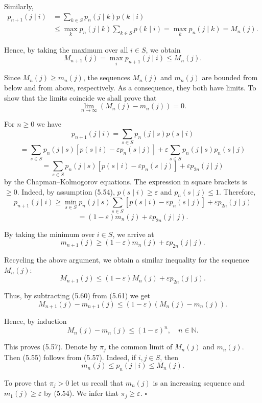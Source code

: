 \begin{Proof}
Similarly,
\[
\begin{aligned}
p_{n+1}(j \mid i) &= \sum_{k \in S} p_n(j \mid k) p(k \mid i) \\
&\leq \max_k p_n(j \mid k) \sum_{k \in S} p(k \mid i) = \max_k p_n(j \mid k) = M_n(j).
\end{aligned}
\]

Hence, by taking the maximum over all $i \in S$, we obtain
\[
M_{n+1}(j) = \max_i p_{n+1}(j \mid i) \leq M_n(j).
\]

Since $M_n(j) \geq m_n(j)$, the sequences $M_n(j)$ and $m_n(j)$ are bounded from below and from above, respectively. As a consequence, they both have limits. To show that the limits coincide we shall prove that
\[
\lim_{n \to \infty} (M_n(j) - m_n(j)) = 0. \tag{5.57}
\]

For $n \geq 0$ we have
\[
p_{n+1}(j \mid i) = \sum_{s \in S} p_n(j \mid s) p(s \mid i) \tag{5.58}
\]
\[
= \sum_{s \in S} p_n(j \mid s) [p(s \mid i) - \varepsilon p_n(s \mid j)] + \varepsilon \sum_{s \in S} p_n(j \mid s) p_n(s \mid j)
\]
\[
= \sum_{s \in S} p_n(j \mid s) [p(s \mid i) - \varepsilon p_n(s \mid j)] + \varepsilon p_{2n}(j \mid j)
\]
by the Chapman--Kolmogorov equations. The expression in square brackets is $\geq 0$. Indeed, by assumption (5.54), $p(s \mid i) \geq \varepsilon$ and $p_n(s \mid j) \leq 1$. Therefore,
\[
p_{n+1}(j \mid i) \geq \min_{s \in S} p_n(j \mid s) \sum_{s \in S} [p(s \mid i) - \varepsilon p_n(s \mid j)] + \varepsilon p_{2n}(j \mid j) \tag{5.59}
\]
\[
= (1 - \varepsilon) m_n(j) + \varepsilon p_{2n}(j \mid j).
\]

By taking the minimum over $i \in S$, we arrive at
\[
m_{n+1}(j) \geq (1 - \varepsilon) m_n(j) + \varepsilon p_{2n}(j \mid j). \tag{5.60}
\]

Recycling the above argument, we obtain a similar inequality for the sequence $M_n(j)$:
\[
M_{n+1}(j) \leq (1 - \varepsilon) M_n(j) + \varepsilon p_{2n}(j \mid j). \tag{5.61}
\]

Thus, by subtracting (5.60) from (5.61) we get
\[
M_{n+1}(j) - m_{n+1}(j) \leq (1 - \varepsilon) (M_n(j) - m_n(j)). \tag{5.62}
\]

Hence, by induction
\[
M_n(j) - m_n(j) \leq (1 - \varepsilon)^n, \quad n \in \mathbb{N}.
\]

This proves (5.57). Denote by $\pi_j$ the common limit of $M_n(j)$ and $m_n(j)$. Then (5.55) follows from (5.57). Indeed, if $i, j \in S$, then
\[
m_n(j) \leq p_n(j \mid i) \leq M_n(j).
\]

To prove that $\pi_j > 0$ let us recall that $m_n(j)$ is an increasing sequence and $m_1(j) \geq \varepsilon$ by (5.54). We infer that $\pi_j \geq \varepsilon$. $\square$
\end{Proof}

